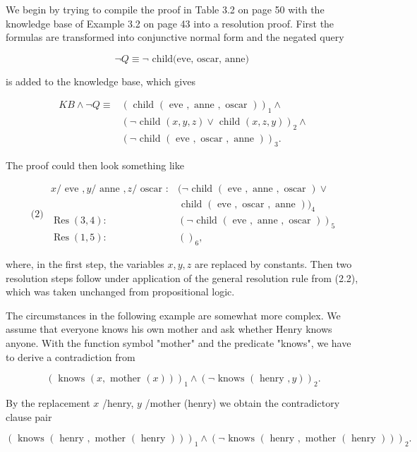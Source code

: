 \documentclass[10pt]{book}
\begin{document}
We begin by trying to compile the proof in Table 3.2 on page 50 with the knowledge base of Example 3.2 on page 43 into a resolution proof. First the formulas are transformed into conjunctive normal form and the negated query

$$
\neg Q \equiv \neg \text { child(eve, oscar, anne) }
$$

is added to the knowledge base, which gives

$$
\begin{aligned}
K B \wedge \neg Q \equiv & (\text { child }(\text { eve }, \text { anne }, \text { oscar }))_{1} \wedge \\
& (\neg \text { child }(x, y, z) \vee \text { child }(x, z, y))_{2} \wedge \\
& (\neg \text { child }(\text { eve }, \text { oscar }, \text { anne }))_{3} .
\end{aligned}
$$

The proof could then look something like

$$
\text { (2) } \begin{aligned}
x / \text { eve }, y / \text { anne }, z / \text { oscar }: & (\neg \text { child }(\text { eve }, \text { anne }, \text { oscar }) \vee \\
& \text { child }(\text { eve }, \text { oscar }, \text { anne }))_{4} \\
\operatorname{Res}(3,4): & (\neg \text { child }(\text { eve }, \text { anne }, \text { oscar }))_{5} \\
\operatorname{Res}(1,5): & ()_{6},
\end{aligned}
$$

where, in the first step, the variables $x, y, z$ are replaced by constants. Then two resolution steps follow under application of the general resolution rule from (2.2), which was taken unchanged from propositional logic.

The circumstances in the following example are somewhat more complex. We assume that everyone knows his own mother and ask whether Henry knows anyone. With the function symbol "mother" and the predicate "knows", we have to derive a contradiction from

$$
(\text { knows }(x, \text { mother }(x)))_{1} \wedge(\neg \text { knows }(\text { henry }, y))_{2} .
$$

By the replacement $x$ /henry, $y$ /mother (henry) we obtain the contradictory clause pair

$$
(\text { knows }(\text { henry }, \text { mother }(\text { henry })))_{1} \wedge(\neg \text { knows }(\text { henry }, \text { mother }(\text { henry })))_{2} .
$$
\end{document}
